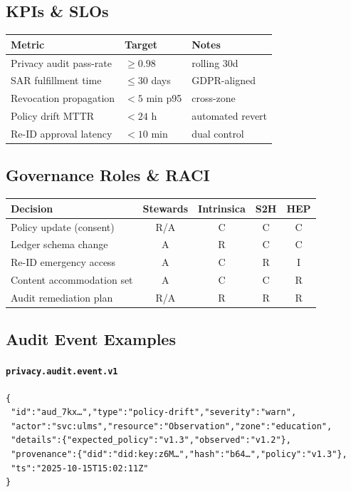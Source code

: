 \documentclass[11pt]{article}
\theoremstyle{plain}
\begin{document}
\subsection{KPIs \& SLOs}
\begin{center}
\begin{tabular}{l l l}
\hline
\textbf{Metric} & \textbf{Target} & \textbf{Notes} \\
\hline
Privacy audit pass-rate & $\ge 0.98$ & rolling 30d \\
SAR fulfillment time & $\le 30$ days & GDPR-aligned \\
Revocation propagation & $< 5$ min p95 & cross-zone \\
Policy drift MTTR & $< 24$ h & automated revert \\
Re-ID approval latency & $< 10$ min & dual control \\
\hline
\end{tabular}
\end{center}

\subsection{Governance Roles \& RACI}
\begin{center}
\begin{tabular}{l c c c c}
\hline
\textbf{Decision} & \textbf{Stewards} & \textbf{Intrinsica} & \textbf{S2H} & \textbf{HEP} \\
\hline
Policy update (consent) & R/A & C & C & C \\
Ledger schema change & A & R & C & C \\
Re-ID emergency access & A & C & R & I \\
Content accommodation set & A & C & C & R \\
Audit remediation plan & R/A & R & R & R \\
\hline
\end{tabular}
\end{center}

\subsection{Audit Event Examples}
\paragraph{\texttt{privacy.audit.event.v1}}
\begin{verbatim}
{
 "id":"aud_7kx…","type":"policy-drift","severity":"warn",
 "actor":"svc:ulms","resource":"Observation","zone":"education",
 "details":{"expected_policy":"v1.3","observed":"v1.2"},
 "provenance":{"did":"did:key:z6M…","hash":"b64…","policy":"v1.3"},
 "ts":"2025-10-15T15:02:11Z"
}
\end{verbatim}
\end{document}
